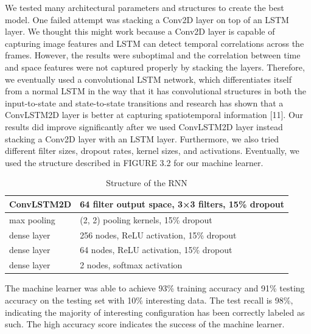 \documentclass[12pt]{article}
\numberwithin{figure}{section} %
\begin{document}
We tested many architectural parameters and structures to create the best model. One failed attempt was stacking a Conv2D layer on top of an LSTM layer. We thought this might work because a Conv2D layer is capable of capturing image features and LSTM can detect temporal correlations across the frames. However, the results were suboptimal and the correlation between time and space features were not captured properly by stacking the layers. Therefore, we eventually used a convolutional LSTM network, which differentiates itself from a normal LSTM in the way that it has convolutional structures in both the input-to-state and state-to-state transitions and research has shown that a ConvLSTM2D layer is better at capturing spatiotemporal information [11]. Our results did improve significantly after we used ConvLSTM2D layer instead stacking a Conv2D layer with an LSTM layer. Furthermore, we also tried different filter sizes, dropout rates, kernel sizes, and activations. Eventually, we used the structure described in FIGURE 3.2 for our machine learner. 
\begin{table}[H]
\begin{center}
\begin{tabular}{ | m{2cm} | m{8cm} | } 
\hline
ConvLSTM2D & 64 filter output space, 3×3 filters, 15\% dropout \\ 
\hline
max pooling & (2, 2) pooling kernels, 15\% dropout  \\ 
\hline
dense layer & 256 nodes, ReLU activation, 15\% dropout  \\ 
\hline
dense layer & 64 nodes, ReLU activation, 15\% dropout  \\ 
\hline
dense layer & 2 nodes, softmax activation \\
\hline
\end{tabular}
\caption{Structure of the RNN}
\vspace{-2.5em}
\end{center}
\end{table}
The machine learner was able to achieve 93\% training accuracy and 91\% testing accuracy on the testing set with 10\% interesting data. The test recall is 98\%, indicating the majority of interesting configuration has been correctly labeled as such. The high accuracy score indicates the success of the machine learner. 
\end{document}
